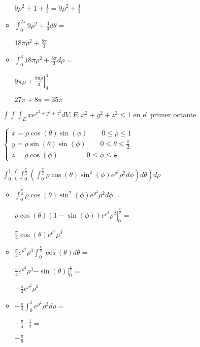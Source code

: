 \documentclass[../practica_09.tex]{subfiles}
\begin{document}
\begin{enumerate}
\begin{itemize}
                    $ 9\rho^2 + 1 + \frac{1}{3} = 9\rho^2 + \frac{4}{3} $

                \item $\int_0^{2\pi} 9\rho^2 + \frac{4}{3} d\theta = $
                
                    $18\pi\rho^2 + \frac{8\pi}{3}$

                \item $\int_0^3 18\pi\rho^2 + \frac{8\pi}{3} d\rho = $
                
                    $\left. 9\pi\rho + \frac{8\pi\rho}{3} \right |_0^3$

                    $ 27\pi + 8 \pi = 35\pi$

            \end{itemize}

        $\int \int \int_E xe^{x^2+y^2+z^2} dV, E: x^2+y^2+z^2\leq 1$ en el primer octante

            $\left \{\begin{array}{ll}
                x = \rho\cos(\theta)\sin(\phi) \qquad 0 \leq \rho \leq 1\\
                y = \rho\sin(\theta)\sin(\phi) \qquad 0 \leq \theta \leq \frac{\pi}{2}\\
                z = \rho\cos(\phi) \qquad\qquad 0 \leq \phi \leq \frac{\pi}{2}
            \end{array} \right.$

            $\int_0^1( \int_0^{\frac{\pi}{2}} ( \int_0^{\frac{\pi}{2}}  \rho\cos(\theta)\sin^2(\phi)e^{\rho^2}\rho^2 d\phi) d\theta ) d\rho$

            \begin{itemize}
                \item $ \int_0^{\frac{\pi}{2}} \rho\cos(\theta)\sin^2(\phi)e^{\rho^2}\rho^2 d\phi = $

                    $ \left. \rho\cos(\theta)(1-\sin(\phi))e^{\rho^2}\rho^2 \right |_0^{\frac{\pi}{2}} = $

                    $ \frac{\pi}{4}\cos(\theta)e^{\rho^2}\rho^3$

                \item $ \frac{\pi}{4}e^{\rho^2}\rho^3 \int_0^{\frac{\pi}{2}} \cos(\theta) d\theta = $

                    $ \frac{\pi}{4}e^{\rho^2}\rho^3  \left. -\sin(\theta) \right |_0^{\frac{\pi}{2}} = $

                    $ -\frac{\pi}{4}e^{\rho^2}\rho^3 $

                \item $-\frac{\pi}{4} \int_0^1 e^{\rho^2}\rho^3 d\rho = $

                    $-\frac{\pi}{4} \cdot \frac{1}{2} = $

                    $ -\frac{\pi}{8} $

            \end{itemize}

    \end{enumerate}
\end{document}
